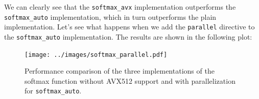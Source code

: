 \documentclass[10pt]{article}
\begin{document}
We can clearly see that the \texttt{softmax\_avx} implementation outperforms the \texttt{softmax\_auto} implementation, which in turn outperforms the plain implementation. Let's see what happens when we add the \texttt{parallel} directive to the \texttt{softmax\_auto} implementation. The results are shown in the following plot:
\begin{figure}[H]
  \centering
  \texttt{[image: ../images/softmax\_parallel.pdf]}
  \caption{Performance comparison of the three implementations of the softmax function without AVX512 support and with parallelization for \texttt{softmax\_auto}.}
  \label{fig:softmax_auto_parallel}
\end{figure}
\end{document}

